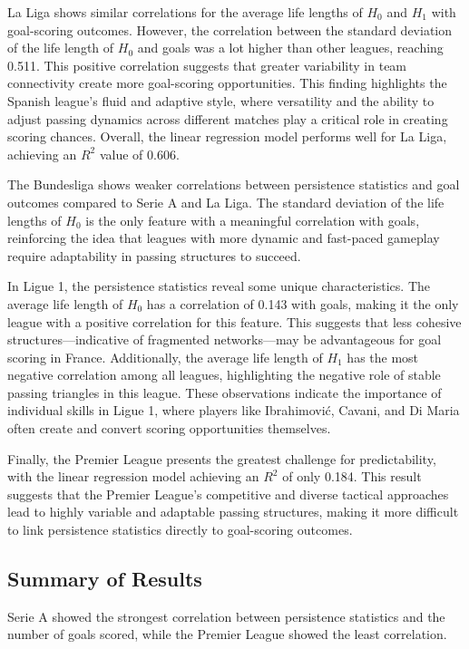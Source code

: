 \documentclass[10pt,twocolumn]{article}
\begin{document}
La Liga shows similar correlations for the average life lengths of $ H_0 $ and $ H_1 $ with goal-scoring outcomes. However, the correlation between the standard deviation of the life length of $ H_0 $ and goals was a lot higher than other leagues, reaching 0.511. This positive correlation suggests that greater variability in team connectivity create more goal-scoring opportunities. This finding highlights the Spanish league's fluid and adaptive style, where versatility and the ability to adjust passing dynamics across different matches play a critical role in creating scoring chances. Overall, the linear regression model performs well for La Liga, achieving an $ R^2 $ value of 0.606.

The Bundesliga shows weaker correlations between persistence statistics and goal outcomes compared to Serie A and La Liga. The standard deviation of the life lengths of $ H_0 $ is the only feature with a meaningful correlation with goals, reinforcing the idea that leagues with more dynamic and fast-paced gameplay require adaptability in passing structures to succeed.

In Ligue 1, the persistence statistics reveal some unique characteristics. The average life length of $ H_0 $ has a correlation of 0.143 with goals, making it the only league with a positive correlation for this feature. This suggests that less cohesive structures—indicative of fragmented networks—may be advantageous for goal scoring in France. Additionally, the average life length of $ H_1 $ has the most negative correlation among all leagues, highlighting the negative role of stable passing triangles in this league. These observations indicate the importance of individual skills in Ligue 1, where players like Ibrahimović, Cavani, and Di Maria often create and convert scoring opportunities themselves.

Finally, the Premier League presents the greatest challenge for predictability, with the linear regression model achieving an $ R^2 $ of only 0.184. This result suggests that the Premier League’s competitive and diverse tactical approaches lead to highly variable and adaptable passing structures, making it more difficult to link persistence statistics directly to goal-scoring outcomes.


\subsection*{Summary of Results}
Serie A showed the strongest correlation between persistence statistics and the number of goals scored, while the Premier League showed the least correlation. 
\end{document}

